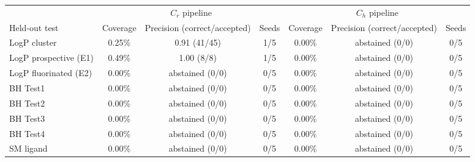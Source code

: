 \begin{tabular}{@{}lcccccc@{}}
\toprule
 & \multicolumn{3}{c}{$C_r$ pipeline} & \multicolumn{3}{c}{$C_h$ pipeline} \\
\cmidrule(lr){2-4}\cmidrule(lr){5-7}
Held-out test & Coverage & Precision (correct/accepted) & Seeds & Coverage & Precision (correct/accepted) & Seeds \\
\midrule
LogP cluster & 0.25\% & 0.91 (41/45) & 1/5 & 0.00\% & abstained (0/0) & 0/5 \\
LogP prospective (E1) & 0.49\% & 1.00 (8/8) & 1/5 & 0.00\% & abstained (0/0) & 0/5 \\
LogP fluorinated (E2) & 0.00\% & abstained (0/0) & 0/5 & 0.00\% & abstained (0/0) & 0/5 \\
BH Test1 & 0.00\% & abstained (0/0) & 0/5 & 0.00\% & abstained (0/0) & 0/5 \\
BH Test2 & 0.00\% & abstained (0/0) & 0/5 & 0.00\% & abstained (0/0) & 0/5 \\
BH Test3 & 0.00\% & abstained (0/0) & 0/5 & 0.00\% & abstained (0/0) & 0/5 \\
BH Test4 & 0.00\% & abstained (0/0) & 0/5 & 0.00\% & abstained (0/0) & 0/5 \\
SM ligand & 0.00\% & abstained (0/0) & 0/5 & 0.00\% & abstained (0/0) & 0/5 \\
\bottomrule
\end{tabular}